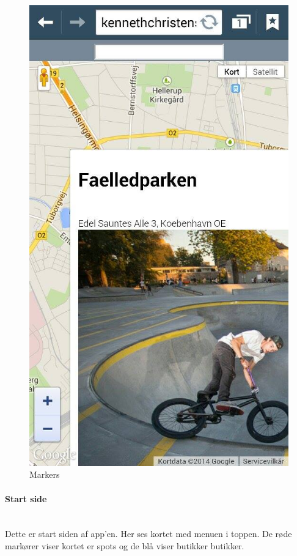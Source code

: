 \documentclass[12pt]{article}
\begin{document}
\begin{figure}[ht]
\begin{minipage}[b]{0.45\linewidth}
\includegraphics[width=\textwidth]{markers}
\caption{Markers}
\label{fig:figure2}
\end{minipage}
\end{figure}


\paragraph{Start side}\mbox{}\\
Dette er start siden af app'en. Her ses kortet med menuen i toppen. De røde markører viser kortet er spots og de blå viser butikker butikker.\\
\end{document}
